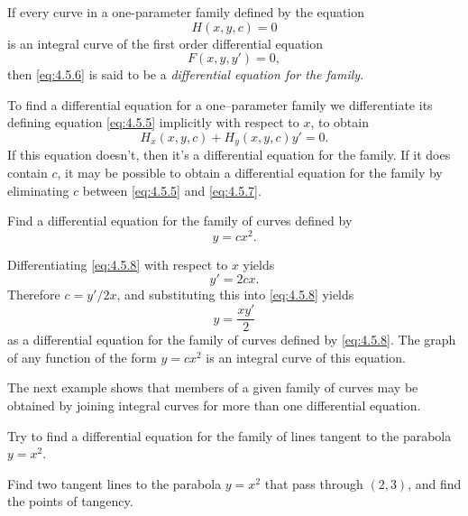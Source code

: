 \begin{definition}\label{thmtype:4.5.2}
If every curve in a one-parameter family defined by the equation
\begin{equation} \label{eq:4.5.5}
H(x,y,c)=0
\end{equation}
is an integral curve of the first order differential equation
\begin{equation} \label{eq:4.5.6}
F(x,y,y')=0,
\end{equation}
then  \eqref{eq:4.5.6} is said to be a \emph{\color{blue}differential equation
for the family}.
\end{definition}

To find a differential equation for a one--parameter family we
differentiate its defining equation \eqref{eq:4.5.5} implicitly with
respect to $x$, to obtain
\begin{equation} \label{eq:4.5.7}
H_x(x,y,c)+H_y(x,y,c)y'=0.
\end{equation}
If this equation doesn't, then it's a differential
equation for the family. If it does contain $c$, it may be
possible to obtain a differential equation for the family by
eliminating $c$ between \eqref{eq:4.5.5} and \eqref{eq:4.5.7}.

\begin{example}\label{example:4.5.5}
Find a differential equation for the family of curves defined by
\begin{equation}  \label{eq:4.5.8}
y=cx^2.
\end{equation}
\end{example}

\begin{solution}
Differentiating
\eqref{eq:4.5.8} with respect to $x$ yields
\[
y'=2cx.
\]
 Therefore $c=y'/2x$, and substituting this into
\eqref{eq:4.5.8} yields
\[
y=\frac{xy'}{2}
\]
 as a differential equation for the family of
curves defined by \eqref{eq:4.5.8}.  The graph of any function of
the form $y=cx^2$ is an integral curve of this equation.
\end{solution}

The next example shows that members of a given family of curves
may be obtained by joining  integral curves for more than one
differential equation.

\begin{example}\label{example:4.5.6}
\begin{alist}
\item %
Try to find a differential equation for the family of lines tangent
to the parabola $y=x^2$.

\item %
Find two tangent lines to  the parabola $y=x^2$ that pass
through $(2,3)$, and find the points of tangency.
\end{alist}
\end{example}

